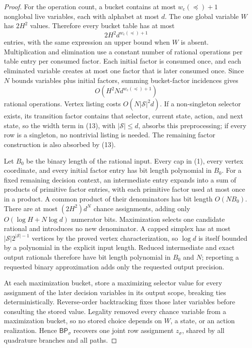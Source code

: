 \documentclass{article}
\begin{document}
\begin{proof}
For the operation count, a bucket contains at most \(w_{\mathrm c}(\preceq)+1\) nonglobal live variables, each with alphabet at most \(d\).  The one global variable \(W\) has \(2H^2\) values.  Therefore every bucket table has at most
\[
 2H^2d^{w_{\mathrm c}(\preceq)+1}
 \tag{12}
\]
entries, with the same expression an upper bound when \(W\) is absent.  Multiplication and elimination use a constant number of rational operations per table entry per consumed factor.  Each initial factor is consumed once, and each eliminated variable creates at most one factor that is later consumed once.  Since \(N\) bounds variables plus initial factors, summing bucket-factor incidences gives
\[
 O\!\left(H^2N d^{w_{\mathrm c}(\preceq)+1}\right)
 \tag{13}
\]
rational operations.  Vertex listing costs \(O(N|\mathcal S|^2d)\).  If a non-singleton selector exists, its transition factor contains that selector, current state, action, and next state, so the width term in (13), with \(|\mathcal S|\le d\), absorbs this preprocessing; if every row is a singleton, no nontrivial listing is needed.  The remaining factor construction is also absorbed by (13).

Let \(B_0\) be the binary length of the rational input.  Every cap in (1), every vertex coordinate, and every initial factor entry has bit length polynomial in \(B_0\).  For a fixed remaining decision context, an intermediate entry expands into a sum of products of primitive factor entries, with each primitive factor used at most once in a product.  A common product of their denominators has bit length \(O(NB_0)\).  There are at most \((2H^2)d^N\) chance assignments, adding only \(O(\log H+N\log d)\) numerator bits.  Maximization selects one candidate rational and introduces no new denominator.  A capped simplex has at most \(|\mathcal S|2^{|\mathcal S|-1}\) vertices by the proved vertex characterization, so \(\log d\) is itself bounded by a polynomial in the explicit input length.  Reduced intermediate and exact output rationals therefore have bit length polynomial in \(B_0\) and \(N\); reporting a requested binary approximation adds only the requested output precision.

At each maximization bucket, store a maximizing selector value for every assignment of the later decision variables in its output scope, breaking ties deterministically.  Reverse-order backtracking fixes those later variables before consulting the stored value.  Legality removed every chance variable from a maximization bucket, so no stored choice depends on \(W\), a state, or an action realization.  Hence \(\mathsf{BP}_\sigma\) recovers one joint row assignment \(z_\sigma\), shared by all quadrature branches and all paths.


\end{proof}
\end{document}
